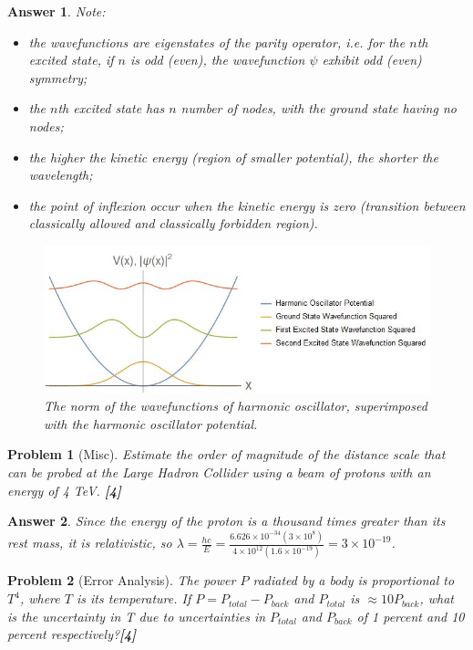 \documentclass[a4paper]{article}
\newtheorem{ans}{Answer}[subsection]
\theoremstyle{new}
\newtheorem{qns}{Problem}[subsection]
\begin{document}
\begin{ans}
Note:
\begin{itemize}
    \item the wavefunctions are eigenstates of the parity operator, i.e. for the $n$th excited state, if $n$ is odd (even), the wavefunction $\psi$ exhibit odd (even) symmetry;
    \item the $n$th excited state has $n$ number of nodes, with the ground state having no nodes;
    \item the higher the kinetic energy (region of smaller potential), the shorter the wavelength;
    \item the point of inflexion occur when the kinetic energy is zero (transition between classically allowed and classically forbidden region).
\end{itemize}
\begin{figure}[H]
    \centering
    \includegraphics[width=\linewidth]{2015P1A2.JPG}
    \caption{The norm of the wavefunctions of harmonic oscillator, superimposed with the harmonic oscillator potential.}
\end{figure}
\end{ans}
\begin{qns}[Misc]
Estimate the order of magnitude of the distance scale that can be probed at the Large Hadron Collider using a beam of protons with an energy of 4 TeV. \hfill\textbf{[4]}
\end{qns}
\begin{ans}
Since the energy of the proton is a thousand times greater than its rest mass, it is relativistic, so $\lambda=\frac{hc}{E}=\frac{6.626\times10^{-34}(3\times10^8)}{4\times10^{12}(1.6\times10^{-19})}=3\times10^{-19}$.
\end{ans}
\newpage
\begin{qns}[Error Analysis]
The power $P$ radiated by a body is proportional to $T^4$, where $T$ is its temperature. If $P = P_{total} − P_{back}$ and $P_{total}$ is $\approx 10P_{back}$, what is the uncertainty in T due to uncertainties in $P_{total}$ and $P_{back}$ of 1 percent and 10 percent respectively?\hfill\textbf{[4]}
\end{qns}
\end{document}
